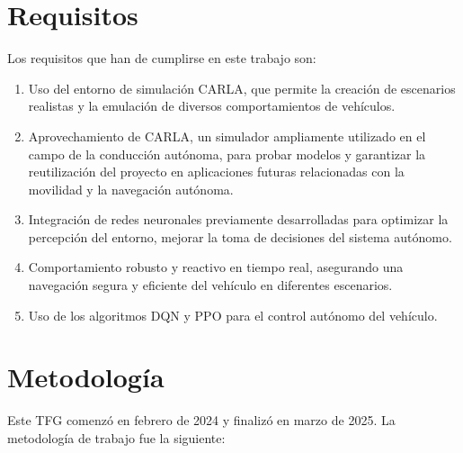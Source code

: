 \section{Requisitos}
\label{sec:requisitos}

Los requisitos que han de cumplirse en este trabajo son: 
\begin{enumerate}
    \item Uso del entorno de simulación CARLA, que permite la creación de escenarios realistas y la emulación de diversos comportamientos de vehículos.
    \item Aprovechamiento de CARLA, un simulador ampliamente utilizado en el campo de la conducción autónoma, para probar modelos y garantizar la reutilización del proyecto en aplicaciones futuras relacionadas con la movilidad y la navegación autónoma.
    \item Integración de redes neuronales previamente desarrolladas para optimizar la percepción del entorno, mejorar la toma de decisiones del sistema autónomo.
    \item Comportamiento robusto y reactivo en tiempo real, asegurando una navegación segura y eficiente del vehículo en diferentes escenarios.
    \item Uso de los algoritmos \ac{DQN} y \ac{PPO} para el control autónomo del vehículo.
\end{enumerate}

\section{Metodología}
\label{sec:metodologia}

Este TFG comenzó en febrero de 2024 y finalizó en marzo de 2025. La metodología de trabajo fue la siguiente:

